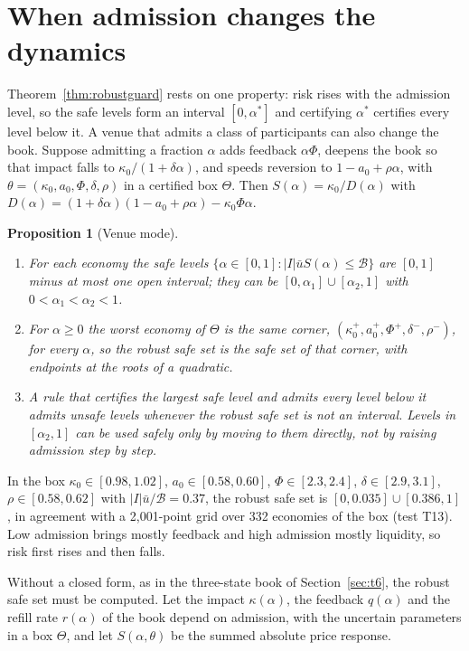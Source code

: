 \documentclass[12pt]{article}
\newtheorem{proposition}[theorem]{Proposition}
\theoremstyle{definition}
\theoremstyle{remark}
\begin{document}
\section{When admission changes the dynamics}
Theorem~\ref{thm:robustguard} rests on one property: risk rises with the admission level, so the safe levels form an interval $[0,\alpha^*]$ and certifying $\alpha^*$ certifies every level below it. A venue that admits a class of participants can also change the book. Suppose admitting a fraction $\alpha$ adds feedback $\alpha\Phi$, deepens the book so that impact falls to $\kappa_0/(1+\delta\alpha)$, and speeds reversion to $1-a_0+\rho\alpha$, with $\theta=(\kappa_0,a_0,\Phi,\delta,\rho)$ in a certified box $\Theta$. Then $S(\alpha)=\kappa_0/D(\alpha)$ with $D(\alpha)=(1+\delta\alpha)(1-a_0+\rho\alpha)-\kappa_0\Phi\alpha$.

\begin{proposition}[Venue mode]\label{prop:venue}
\begin{enumerate}[label=(\roman*)]
\item For each economy the safe levels $\{\alpha\in[0,1]:|I|\bar uS(\alpha)\le\mathcal B\}$ are $[0,1]$ minus at most one open interval; they can be $[0,\alpha_1]\cup[\alpha_2,1]$ with $0<\alpha_1<\alpha_2<1$.
\item For $\alpha\ge0$ the worst economy of $\Theta$ is the same corner, $(\kappa_0^+,a_0^+,\Phi^+,\delta^-,\rho^-)$, for every $\alpha$, so the robust safe set is the safe set of that corner, with endpoints at the roots of a quadratic.
\item A rule that certifies the largest safe level and admits every level below it admits unsafe levels whenever the robust safe set is not an interval. Levels in $[\alpha_2,1]$ can be used safely only by moving to them directly, not by raising admission step by step.
\end{enumerate}
\end{proposition}

In the box $\kappa_0\in[0.98,1.02]$, $a_0\in[0.58,0.60]$, $\Phi\in[2.3,2.4]$, $\delta\in[2.9,3.1]$, $\rho\in[0.58,0.62]$ with $|I|\bar u/\mathcal B=0.37$, the robust safe set is $[0,0.035]\cup[0.386,1]$, in agreement with a 2{,}001-point grid over 332 economies of the box (test T13). Low admission brings mostly feedback and high admission mostly liquidity, so risk first rises and then falls.

Without a closed form, as in the three-state book of Section~\ref{sec:t6}, the robust safe set must be computed. Let the impact $\kappa(\alpha)$, the feedback $q(\alpha)$ and the refill rate $r(\alpha)$ of the book depend on admission, with the uncertain parameters in a box $\Theta$, and let $S(\alpha,\theta)$ be the summed absolute price response.
\end{document}
